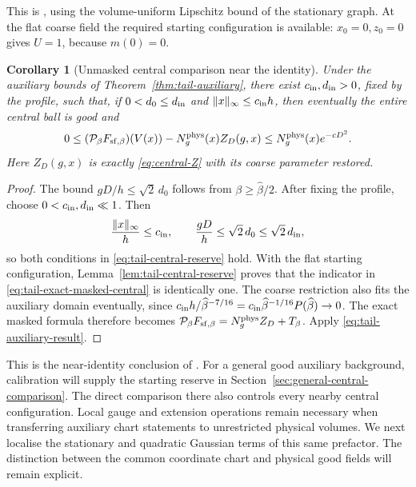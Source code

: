 \documentclass[11pt,reqno]{amsart}
\numberwithin{equation}{section}
\newtheorem{corollary}[theorem]{Corollary}
\theoremstyle{definition}
\theoremstyle{remark}
\begin{document}
This is \cite[Lemma~15.5 and (15.8), p.~77]{Main}, using
the volume-uniform Lipschitz bound of the stationary graph.
At the flat coarse field the required starting
configuration is available: \(x_0=0,z_0=0\) gives
\(U=1\), because \(m(0)=0\).

\begin{corollary}[Unmasked central comparison near the identity]
\label{cor:tail-near-identity}
Under the auxiliary bounds of
Theorem~\ref{thm:tail-auxiliary}, there exist
\(c_{\rm in},d_{\rm in}>0\), fixed by the profile,
such that, if \(0<d_0\le d_{\rm in}\) and
\(\|x\|_\infty\le c_{\rm in}h\), then eventually
the entire central ball is good and
\begin{equation}
       0\le (\mathcal P_\beta F_{{\rm sf},\beta})(V(x))
                          -N_g^{\mathrm{phys}}(x)Z_D(g,x)
                           \le N_g^{\mathrm{phys}}(x)e^{-cD^2}.
 \label{eq:tail-near-identity}
\end{equation}
Here \(Z_D(g,x)\) is exactly
\eqref{eq:central-Z} with its coarse parameter restored.
\end{corollary}
\begin{proof}
The bound \(gD/h\le\sqrt2\,d_0\) follows from
\(\beta\ge\widehat\beta/2\). After fixing the profile, choose
\(0<c_{\rm in},d_{\rm in}\ll1\). Then
\[
       \frac{\|x\|_\infty}{h}\le c_{\rm in},\qquad
       \frac{gD}{h}\le\sqrt2\,d_0\le\sqrt2\,d_{\rm in},
\]
so both conditions in \eqref{eq:tail-central-reserve} hold.
With the flat starting configuration,
Lemma~\ref{lem:tail-central-reserve} proves that the
indicator in \eqref{eq:tail-exact-masked-central} is
identically one. The coarse restriction also fits the
auxiliary domain eventually, since
\(c_{\rm in}h/\widehat\beta^{-7/16}
=c_{\rm in}\widehat\beta^{-1/16}P(\widehat\beta)\to0\).
The exact masked formula therefore becomes
\(\mathcal P_\beta F_{{\rm sf},\beta}=N_g^{\mathrm{phys}} Z_D+T_\beta\).
Apply \eqref{eq:tail-auxiliary-result}.
\end{proof}

This is the near-identity conclusion of
\cite[Corollary~15.6 and (15.9), pp.~77--78]{Main}.
For a general good auxiliary background, calibration will supply
the starting reserve in Section~\ref{sec:general-central-comparison}.
The direct comparison there also controls every nearby central
configuration. Local gauge and extension operations remain
necessary when transferring auxiliary chart statements to
unrestricted physical volumes.
We next localise the stationary and quadratic Gaussian
terms of this same prefactor. The distinction between
the common coordinate chart and physical good fields
will remain explicit.
\end{document}
